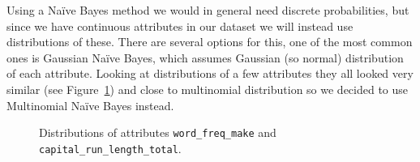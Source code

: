 \documentclass[11pt,a4paper]{article}
\begin{document}
\newpage
\noindent
{}

\smallskip

Using a Na\"ive Bayes method we would in general need discrete probabilities, but since we have continuous attributes in our dataset we will instead use distributions of these. There are several options for this, one of the most common ones is Gaussian Na\"ive Bayes, which assumes Gaussian (so normal) distribution of each attribute. Looking at distributions of a few attributes they all looked very similar (see Figure~\ref{fig:violinplots}) and close to multinomial distribution so we decided to use Multinomial Na\"ive Bayes instead.
\begin{figure}[ht!]
\centering
  \hfill
  \caption{Distributions of attributes {\tt word\_freq\_make} and {\tt capital\_run\_length\_total}.}
\label{fig:violinplots}
\end{figure}
\end{document}

